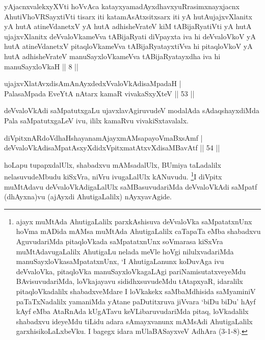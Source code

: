 
\begin{kandikeshl}
yAjacnxvalekxyXVti hoVvAca katayxyamadAyxdhavxyuRrasimxnayxjacnx AhutiV\-\break hoVRSayxtiVti tisarx iti katamAsAtxsitxsarx iti yA hutA\break ujajxvXlanitx yA hutA atineVdanetxV yA hutA adhisheVrateV kiM tABijaRyatiVti yA hutA ujajxvXlanitx deVvaloVkameVva tABijaRyati diVpayxta iva hi deVvaloVkoV yA hutA atineVdanetxV pitaqloVkameVva tABijaRyatayxtiVva hi pitaqloVkoV yA hutA adhisheVrateV manuSayxloVkameVva tABijaRyatayxdha iva hi manuSayxloVkaH || 8 ||
\end{kandikeshl}

\begin{shl}
ujajxvXlatAvxdisAmAnAyxdedxVvaloVkAdisaMpadaH |\\
PalasaMpada EveYtA nAtarx kamaR vivakaSxyXteV \hfill || 53 ||
\end{shl}

\begin{artha}
deVvaloVkAdi saMpatutxgaLu ujavxlavAgiruvudeV modalAda sAdaqshayxdiMda Pala saMpatutxgaLeV ivu, ililx kamaRvu vivakiSxtavalalx.
\end{artha}


\begin{shl}
diVpitxnARdoV\s dhaHshayanamAjayxmAMsapayoVmaBxsAmf |\\
deVvaloVkAdisaMpatAsxyXdidxVpitxmatAtxvXdisaMBavAtf \hfill || 54 ||
\end{shl}

\begin{artha}
hoLapu tupapxdalUlx, shabadxvu mAMsadalUlx, BUmiya taLadalilx nelasuvudeMbudu kiSxVra, niVru ivugaLalUlx kANuvudu. \footnote{ajayx muMtAda AhutigaLalilx parxkAshisuva deVvaloVka saMpatatxnUnx hoVma mADida mAMsa muMtAda AhutigaLalilx caTapaTa eMba shabadxvu AguvudariMda pitaqloVkada saMpatatxnUnx soVmarasa kiSxVra muMtAdavugaLalilx AhutigaLu nelada meVle hoVgi nilulxvadariMda manuSayxloVkasaMpatatxnUnx, `I AhutigaLanunx koDuvAga ivu deVvaloVka, pitaqloVka manuSayxloVkagaLAgi pariNamisutatxveyeMdu BAvisuvudariMda, loVkajayavu sididhxsuvudeMdu tAtapxyaR, idaralilx pitaqloVkadalilx shabadxveMdare I loVkakekx saMbaMdhisida saMyaminiV paTaTxNadalilx yamaniMda yAtane paDutitxruva jiVvara `biDu biDu' hAyf kAyf eMba AtaRnAda kUgATavu keVLibaruvudariMda pitaq, loVkadalilx shabadxvu ideyeMdu tiLidu adara sAmayxvanunx mAMsAdi AhutigaLalilx garxhisikoLaLxbeVku. I bagegx idara mUlaBASayxveV AdhAra (3-1-8).}I diVpitx muMtAdavu deVvaloVkAdigaLalUlx saMBasuvudariMda deVvaloVkAdi saMpatf (dhAyxna)vu (ajAyxdi AhutigaLalilx) nAyxyavAgide.
\end{artha}


